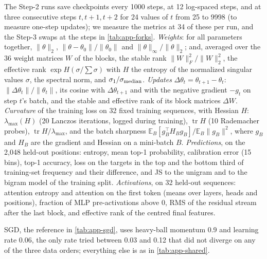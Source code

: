 The Step-2 runs save checkpoints every 1000 steps, at 12 log-spaced steps, and at three consecutive steps $t,t+1,t+2$
for 24 values of $t$ from 25 to 9998 (to measure one-step updates); we measure the metrics at 34 of these per run, and
the Step-3 swaps at the steps in \cref{tab:app-forks}. \emph{Weights}: for all parameters together, $\|\theta\|_2$,
$\|\theta-\theta_0\|/\|\theta_0\|$ and $\|\theta\|_\infty/\|\theta\|_2$; and, averaged over the 36 weight matrices
$W$ of the blocks, the stable rank $\|W\|_F^2/\|W\|_2^2$, the effective rank $\exp H(\sigma/\textstyle\sum\sigma)$
with $H$ the entropy of the normalized singular values $\sigma$, the spectral norm, and $\sigma_1/\sigma_{\rm median}$.
\emph{Updates} $\Delta\theta_t=\theta_{t+1}-\theta_t$: $\|\Delta\theta_t\|/\|\theta_t\|$, its cosine with
$\Delta\theta_{t+1}$ and with the negative gradient $-g_t$ on step $t$'s batch, and the stable and effective rank of
its block matrices $\Delta W$. \emph{Curvature} of the training loss on 32 fixed training sequences, with Hessian $H$:
$\lambda_{\max}(H)$ (20 Lanczos iterations, logged during training), $\operatorname{tr}H$ (10 Rademacher probes),
$\operatorname{tr}H/\lambda_{\max}$, and the batch sharpness $\mathbb{E}_B[g_B^\top H_Bg_B]/\mathbb{E}_B\|g_B\|^2$,
where $g_B$ and $H_B$ are the gradient and Hessian on a mini-batch $B$.
\emph{Predictions}, on the 2{,}048 held-out
positions: entropy, mean top-1 probability, calibration error (15 bins), top-1 accuracy, loss on the targets in the top
and the bottom third of training-set frequency and their difference, and JS to the unigram and to the bigram model
of the training split. \emph{Activations}, on 32 held-out sequences: attention entropy
and attention on the first token (means over layers, heads and positions), fraction of MLP pre-activations above 0,
RMS of the residual stream after the last block, and effective rank of the centred final features.

SGD, the reference in \cref{tab:app-sgd}, uses heavy-ball momentum 0.9 and learning rate 0.06, the only rate tried
between 0.03 and 0.12 that did not diverge on any of the three data orders; everything else is as in
\cref{tab:app-shared}.

